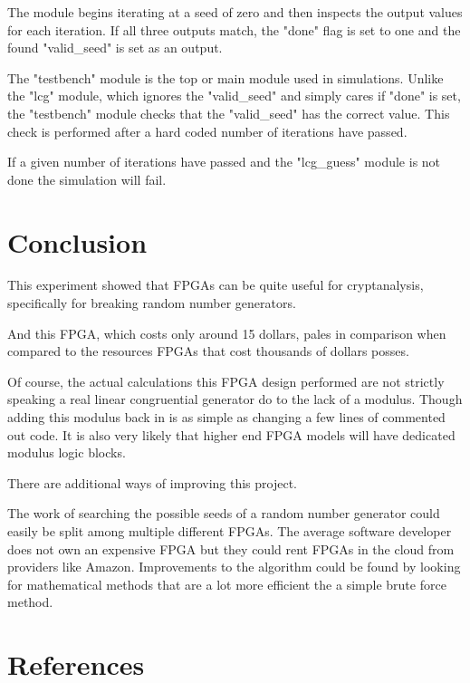\documentclass{article}
\begin{document}
    The module begins iterating at a seed of zero and then inspects the output values for each iteration.
    If all three outputs match, the "done" flag is set to one and the found "valid\_seed" is set as an output.

    The "testbench" module is the top or main module used in simulations.
    Unlike the "lcg" module, which ignores the "valid\_seed" and simply cares if "done" is set,
    the "testbench" module checks that the "valid\_seed" has the correct value.
    This check is performed after a hard coded number of iterations have passed.

    If a given number of iterations have passed and the "lcg\_guess" module is not done
    the simulation will fail.

    \section{Conclusion}

    This experiment showed that FPGAs can be quite useful for
    cryptanalysis, specifically for breaking random number generators.

    And this FPGA, which costs only around 15 dollars, pales in comparison
    when compared to the resources FPGAs that cost thousands of dollars posses.

    Of course, the actual calculations this FPGA design performed are not
    strictly speaking a real linear congruential generator
    do to the lack of a modulus. Though adding this modulus back
    in is as simple as changing a few lines of commented out code.
    It is also very likely that higher end FPGA models will have
    dedicated modulus logic blocks.

    There are additional ways of improving this project.

    The work of searching the possible seeds of a random number generator
    could easily be split among multiple different FPGAs.
    The average software developer does not own an expensive FPGA
    but they could rent FPGAs in the cloud from providers like Amazon.
    Improvements to the algorithm could be found by looking for mathematical
    methods that are a lot more efficient the a simple brute force method.
    
    \break
    \section*{References}
\end{document}
